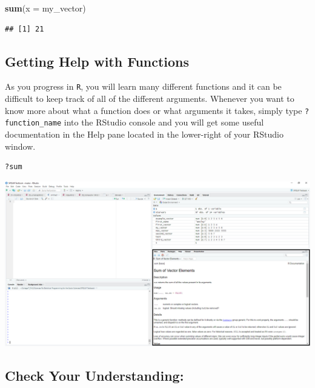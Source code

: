 \documentclass[
]{book}
\newenvironment{Shaded}{\begin{snugshade}}{\end{snugshade}}
\newcommand{\AttributeTok}[1]{\textcolor[rgb]{0.13,0.29,0.53}{#1}}
\newcommand{\FunctionTok}[1]{\textcolor[rgb]{0.13,0.29,0.53}{\textbf{#1}}}
\newcommand{\NormalTok}[1]{#1}
\begin{document}
\begin{Shaded}
\begin{Highlighting}[]
\FunctionTok{sum}\NormalTok{(}\AttributeTok{x =}\NormalTok{ my\_vector)}
\end{Highlighting}
\end{Shaded}

\begin{verbatim}
## [1] 21
\end{verbatim}

\hypertarget{getting-help-with-functions}{%
\subsection{Getting Help with Functions}\label{getting-help-with-functions}}

As you progress in \texttt{R}, you will learn many different functions and it can be difficult to keep track of all of the different arguments. Whenever you want to know more about what a function does or what arguments it takes, simply type \texttt{?function\_name} into the RStudio console and you will get some useful documentation in the Help pane located in the lower-right of your RStudio window.

\begin{verbatim}
?sum
\end{verbatim}

\includegraphics{docs/_main_files/figure-html/RStudio_Help Pane.PNG}

\hypertarget{check-your-understanding}{%
\subsection*{Check Your Understanding:}\label{check-your-understanding}}
\end{document}
